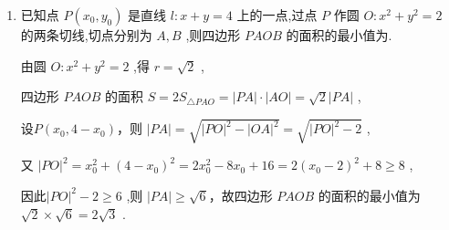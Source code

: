\begin{enumerate}
    \item 已知点 $P\left( {{x}_{0},{y}_{0}}\right)$ 是直线 $l : x + y = 4$ 上的一点,过点 $P$ 作圆 $O : {x}^{2} + {y}^{2} = 2$ 的两条切线,切点分别为 $A,B$ ,则四边形 ${PAOB}$ 的面积的最小值为.

    \begin{jieda}
        由圆 $O : {x}^{2} + {y}^{2} = 2$ ,得 $r = \sqrt{2}$ ,
        
        四边形 ${PAOB}$ 的面积 $S = 2{S}_{\bigtriangleup {PAO}} = \left| {PA}\right|  \cdot  \left| {AO}\right|  = \sqrt{2}\left| {PA}\right|$ ,
        
        设$P\left( {{x}_{0},4 - {x}_{0}}\right)$，则 $\left| {PA}\right|  = \sqrt{{\left| PO\right| }^{2} - {\left| OA\right| }^{2}} = \sqrt{{\left| PO\right| }^{2} - 2}$ ,
        
        又 ${\left| PO\right| }^{2} = {x}_{0}^{2} + {\left( 4 - {x}_{0}\right) }^{2} = 2{x}_{0}^{2} - 8{x}_{0} + {16} = 2{\left( {x}_{0} - 2\right) }^{2} + 8 \geq  8$ ,
        
        因此${\left| PO\right| }^{2} - 2 \geq  6$ ,则 $\left| {PA}\right|  \geq  \sqrt{6}$，故四边形 ${PAOB}$ 的面积的最小值为 $\sqrt{2} \times  \sqrt{6} = 2\sqrt{3}$ .
    \end{jieda}
\end{enumerate}

